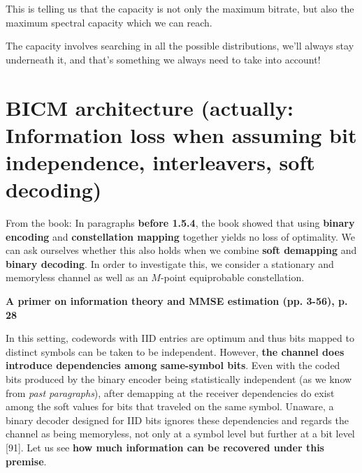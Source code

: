\documentclass[a4paper, 11pt]{book}
\begin{document}
\begin{tcolorbox}[frame empty, sharp corners, boxrule=0pt, leftrule=2pt, colframe=green!60!black, colback=green!5, left=5pt, top=3pt, bottom=3pt]
    This is telling us that the capacity is not only the maximum bitrate, but also the maximum spectral capacity which we can reach.
\end{tcolorbox}

\vspace{0.2em}

\begin{tcolorbox}[frame empty, sharp corners, boxrule=0pt, leftrule=2pt, colframe=green!60!black, colback=green!5, left=5pt, top=3pt, bottom=3pt]
    The capacity involves searching in all the possible distributions, we'll always stay underneath it, and that's something we always need to take into account!
\end{tcolorbox}

\section[BICM architecture]{BICM architecture (actually: Information loss when assuming bit independence, interleavers, soft decoding)}

From the book:
In paragraphs \textbf{before 1.5.4}, the book showed that using \textbf{binary encoding} and \textbf{constellation mapping} together yields no loss of optimality. We can ask ourselves whether this also holds when we combine \textbf{soft demapping} and \textbf{binary decoding}.
In order to investigate this, we consider a stationary and memoryless channel as well as an $M$-point equiprobable constellation.

\begin{tcolorbox}[colframe=yellow!80!black, colback=yellow!10, boxrule=1pt, arc=2pt]
    \textbf{ A primer on information theory and MMSE estimation (pp. 3-56), p. 28}

    In this setting, codewords with IID entries are optimum and thus bits mapped to distinct symbols can be taken to be independent. However, \textbf{the channel does introduce dependencies among same-symbol bits}. Even with the coded bits produced by the binary encoder being statistically independent (as we know from \textit{past paragraphs}), after demapping at the receiver dependencies do exist among the soft values for bits that traveled on the same symbol. Unaware, a binary decoder designed for IID bits ignores these dependencies and regards the channel as being memoryless, not only at a symbol level but further at a bit level [91]. Let us see \textbf{how much information can be recovered under this premise}.
\end{tcolorbox}
\end{document}
